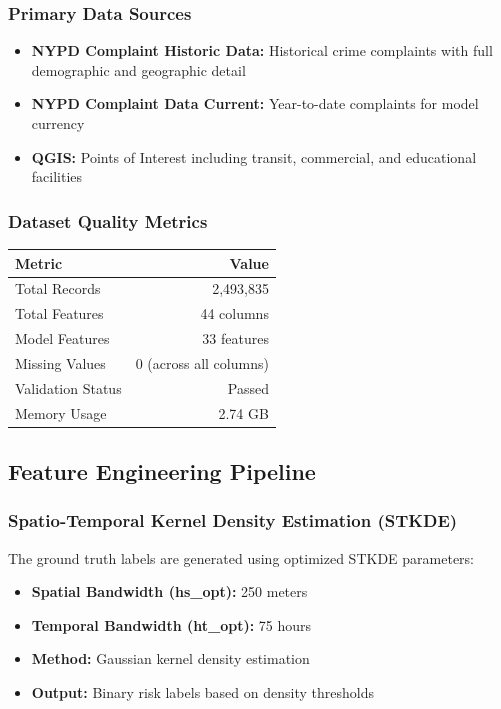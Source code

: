 \documentclass[11pt]{article}
\begin{document}
\subsubsection{Primary Data Sources}
\begin{itemize}[leftmargin=*]
\item \textbf{NYPD Complaint Historic Data:} Historical crime complaints with full demographic and geographic detail
\item \textbf{NYPD Complaint Data Current:} Year-to-date complaints for model currency
\item \textbf{QGIS:} Points of Interest including transit, commercial, and educational facilities
\end{itemize}

\subsubsection{Dataset Quality Metrics}
\begin{center}
\begin{tabular}{l r}
\toprule
\textbf{Metric} & \textbf{Value} \\
\midrule
Total Records & 2,493,835 \\
Total Features & 44 columns \\
Model Features & 33 features \\
Missing Values & 0 (across all columns) \\
Validation Status & Passed \\
Memory Usage & 2.74 GB \\
\bottomrule
\end{tabular}
\end{center}

\subsection{Feature Engineering Pipeline}

\subsubsection{Spatio-Temporal Kernel Density Estimation (STKDE)}
The ground truth labels are generated using optimized STKDE parameters:
\begin{itemize}[leftmargin=*]
\item \textbf{Spatial Bandwidth (hs\_opt):} 250 meters
\item \textbf{Temporal Bandwidth (ht\_opt):} 75 hours
\item \textbf{Method:} Gaussian kernel density estimation
\item \textbf{Output:} Binary risk labels based on density thresholds
\end{itemize}
\end{document}

